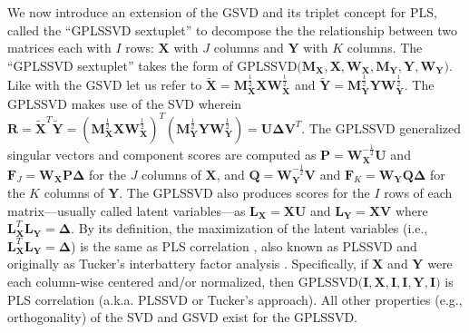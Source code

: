 \documentclass[12pt]{article}
\begin{document}
We now introduce an extension of the GSVD and its triplet concept for
PLS, called the ``GPLSSVD sextuplet'' to decompose the the relationship
between two matrices each with \(I\) rows: \({\mathbf X}\) with \(J\)
columns and \({\mathbf Y}\) with \(K\) columns. The ``GPLSSVD
sextuplet'' takes the form of
\(\mathrm{GPLSSVD(} {\mathbf M}_{\mathbf X}, {\mathbf X}, {\mathbf W}_{\mathbf X}, {\mathbf M}_{\mathbf Y}, {\mathbf Y}, {\mathbf W}_{\mathbf Y} \mathrm{)}\).
Like with the GSVD let us refer to
\(\widetilde{\mathbf X} = {\mathbf M}_{\mathbf X}^{\frac{1}{2}}{\mathbf X}{\mathbf W}_{\mathbf X}^{\frac{1}{2}}\)
and
\(\widetilde{\mathbf Y} = {\mathbf M}_{\mathbf Y}^{\frac{1}{2}}{\mathbf Y}{\mathbf W}_{\mathbf Y}^{\frac{1}{2}}\).
The GPLSSVD makes use of the SVD wherein
\({\mathbf R} = \widetilde{\mathbf{X}}^{T}\widetilde{\mathbf{Y}} = ({\mathbf M}_{\mathbf X}^{\frac{1}{2}}{\mathbf X}{\mathbf W}_{\mathbf X}^{\frac{1}{2}})^{T}({\mathbf M}_{\mathbf Y}^{\frac{1}{2}}{\mathbf Y}{\mathbf W}_{\mathbf Y}^{\frac{1}{2}}) = {\mathbf U} {\boldsymbol \Delta} {\mathbf V}^{T}\).
The GPLSSVD generalized singular vectors and component scores are
computed as
\({\mathbf P} = {\mathbf W}_{{\mathbf X}}^{-\frac{1}{2}}{\mathbf U}\)
and
\({\mathbf F}_{J} = {\mathbf W}_{{\mathbf X}}{\mathbf P}{\boldsymbol \Delta}\)
for the \(J\) columns of \({\mathbf X}\), and
\({\mathbf Q} = {\mathbf W}_{{\mathbf Y}}^{-\frac{1}{2}}{\mathbf V}\)
and
\({\mathbf F}_{K} = {\mathbf W}_{{\mathbf Y}}{\mathbf Q}{\boldsymbol \Delta}\)
for the \(K\) columns of \({\mathbf Y}\). The GPLSSVD also produces
scores for the \(I\) rows of each matrix---usually called latent
variables---as \({\mathbf L}_{\mathbf X} = {\mathbf X}{\mathbf U}\) and
\({\mathbf L}_{\mathbf Y} = {\mathbf X}{\mathbf V}\) where
\({\mathbf L}_{\mathbf X}^{T} {\mathbf L}_{\mathbf Y} = {\boldsymbol \Delta}\).
By its definition, the maximization of the latent variables (i.e.,
\({\mathbf L}_{\mathbf X}^{T} {\mathbf L}_{\mathbf Y} = {\boldsymbol \Delta}\))
is the same as PLS correlation
\citep{krishnan_partial_2011, bookstein1994partial, mcintosh_spatial_1996},
also known as PLSSVD \citep{tenenhaus_regression_1998} and originally as
Tucker's interbattery factor analysis \citep{tucker_inter-battery_1958}.
Specifically, if \({\mathbf X}\) and \({\mathbf Y}\) were each
column-wise centered and/or normalized, then
\(\mathrm{GPLSSVD(} {\mathbf I}, {\mathbf X}, {\mathbf I}, {\mathbf I}, {\mathbf Y}, {\mathbf I} \mathrm{)}\)
is PLS correlation (a.k.a. PLSSVD or Tucker's approach). All other
properties (e.g., orthogonality) of the SVD and GSVD exist for the
GPLSSVD.
\end{document}
